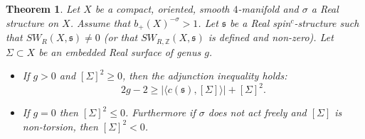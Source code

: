\documentclass{amsart}
\newtheorem{theorem}{Theorem}[section]
\theoremstyle{definition}
\theoremstyle{remark}
\numberwithin{equation}{section}
\begin{document}
\begin{theorem}\label{thm:adjunctionr}
Let $X$ be a compact, oriented, smooth $4$-manifold and $\sigma$ a Real structure on $X$. Assume that $b_+(X)^{-\sigma} > 1$. Let $\mathfrak{s}$ be a Real spin$^c$-structure such that $SW_R(X , \mathfrak{s}) \neq 0$ (or that $SW_{R,\mathbb{Z}}(X , \mathfrak{s})$ is defined and non-zero). Let $\Sigma \subset X$ be an embedded Real surface of genus $g$.
\begin{itemize}
\item[(1)]{If $g>0$ and $[\Sigma]^2 \ge 0$, then the adjunction inequality holds:
\[
2g-2 \ge | \langle c(\mathfrak{s}) , [\Sigma] \rangle | + [\Sigma]^2.
\]
}
\item[(2)]{If $g=0$ then $[\Sigma]^2 \le 0$. Furthermore if $\sigma$ does not act freely and $[\Sigma]$ is non-torsion, then $[\Sigma]^2 < 0$.}
\end{itemize}

\end{theorem}
\end{document}
